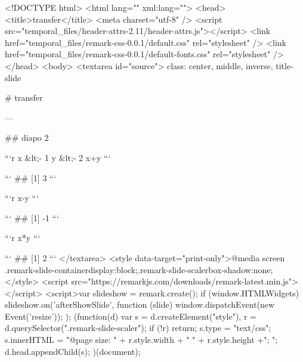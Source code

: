 <!DOCTYPE html>
<html lang="" xml:lang="">
  <head>
    <title>transfer</title>
    <meta charset="utf-8" />
    <script src="temporal_files/header-attrs-2.11/header-attrs.js"></script>
    <link href="temporal_files/remark-css-0.0.1/default.css" rel="stylesheet" />
    <link href="temporal_files/remark-css-0.0.1/default-fonts.css" rel="stylesheet" />
  </head>
  <body>
    <textarea id="source">
class: center, middle, inverse, title-slide

# transfer

---


## diapo 2


```r
x &lt;- 1
y &lt;- 2
x+y
```

```
## [1] 3
```

```r
x-y
```

```
## [1] -1
```

```r
x*y
```

```
## [1] 2
```
    </textarea>
<style data-target="print-only">@media screen {.remark-slide-container{display:block;}.remark-slide-scaler{box-shadow:none;}}</style>
<script src="https://remarkjs.com/downloads/remark-latest.min.js"></script>
<script>var slideshow = remark.create();
if (window.HTMLWidgets) slideshow.on('afterShowSlide', function (slide) {
  window.dispatchEvent(new Event('resize'));
});
(function(d) {
  var s = d.createElement("style"), r = d.querySelector(".remark-slide-scaler");
  if (!r) return;
  s.type = "text/css"; s.innerHTML = "@page {size: " + r.style.width + " " + r.style.height +"; }";
  d.head.appendChild(s);
})(document);

